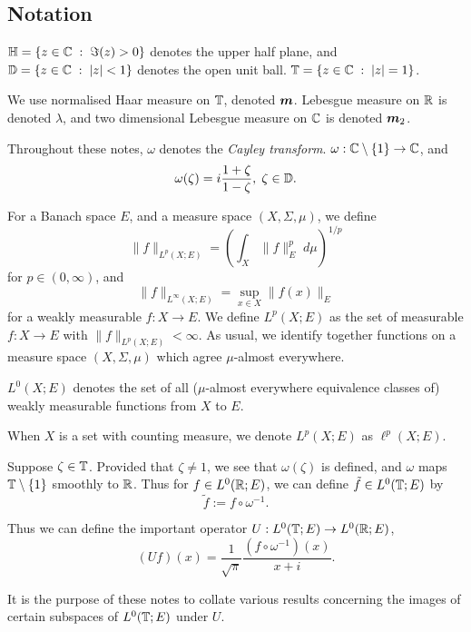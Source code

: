 \subsection{Notation}
$\mathbb{H} = \{z \in \mathbb{C}\;:\;\Im(z) > 0\}$ denotes the upper half plane,
and $\mathbb{D} = \{z\in \mathbb{C}\;:\; |z| < 1\}$ denotes the open unit ball.
$\mathbb{T} = \{z \in \mathbb{C}\;:\; |z| = 1\}$.

We use normalised Haar measure on $\mathbb{T}$, denoted $\boldsymbol{m}$. Lebesgue
measure on $\mathbb{R}$ is denoted $\lambda$, and two dimensional Lebesgue measure on
$\mathbb{C}$ is denoted $\boldsymbol{m}_2$.

Throughout these notes, $\omega$ denotes the \emph{Cayley transform}.
$\omega:\mathbb{C}\setminus\{1\}\rightarrow \mathbb{C}$, and 
\begin{equation}
    \omega(\zeta) = i\frac{1+\zeta}{1-\zeta},\;\zeta \in \mathbb{D}.
\end{equation}

For a Banach space $E$, and a measure space $(X,\Sigma,\mu)$, we define
\begin{equation}
    \|f\|_{L^p(X;E)} = \left(\int_X \|f\|_E^p \;d\mu\right)^{1/p}
\end{equation}
for $p \in (0,\infty)$, and
\begin{equation}
    \|f\|_{L^\infty(X;E)} = \sup_{x \in X} \|f(x)\|_E
\end{equation}
for a weakly measurable $f:X\rightarrow E$. We define $L^p(X;E)$ as the set
of measurable $f:X\rightarrow E$ with $\|f\|_{L^p(X;E)} < \infty$. As usual, 
we identify together functions on a measure space $(X,\Sigma,\mu)$ 
which agree $\mu$-almost everywhere.

$L^0(X;E)$ denotes the set of all ($\mu$-almost everywhere equivalence classes of)
weakly measurable functions from $X$ to $E$.

When $X$ is a set with counting measure, we denote $L^p(X;E)$ as $\ell^p(X;E)$.

Suppose $\zeta \in \mathbb{T}$. Provided that $\zeta \neq 1$, we see that $\omega(\zeta)$
is defined, and $\omega$ maps $\mathbb{T}\setminus\{1\}$ smoothly to $\mathbb{R}$. Thus for
$f \in L^0(\mathbb{R};E)$, we can define $\tilde{f} \in L^0(\mathbb{T};E)$
by 
\begin{equation}
    \tilde{f} := f\circ \omega^{-1}.
\end{equation}

Thus we can define the important operator $U:L^0(\mathbb{T};E)\rightarrow L^0(\mathbb{R};E)$,
\begin{equation}
    (U f)(x) = \frac{1}{\sqrt{\pi}}\frac{(f\circ \omega^{-1})(x)}{x+i}.
\end{equation}

It is the purpose of these notes to collate various results concerning the images
of certain subspaces of $L^0(\mathbb{T};E)$ under $U$.

